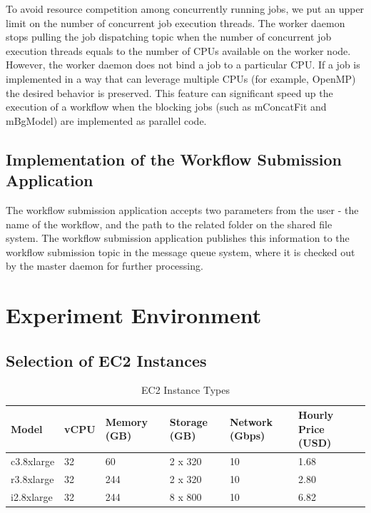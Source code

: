 To avoid resource competition among concurrently running jobs, we put an upper limit on the number of concurrent job execution threads. The worker daemon stops pulling the job dispatching topic when the number of concurrent job execution threads equals to the number of CPUs available on the worker node. However, the worker daemon does not bind a job to a particular CPU. If a job is implemented in a way that can leverage multiple CPUs (for example,  OpenMP) the desired behavior is preserved. This feature can significant speed up the execution of a workflow when the blocking jobs (such as mConcatFit and mBgModel) are implemented as parallel code. 

\subsection{Implementation of the Workflow Submission Application}
\label{sec:subsec:submission_application}

The workflow submission application accepts two parameters from the user - the name of the workflow, and the path to the related folder on the shared file system. The workflow submission application publishes this information to the workflow submission topic in the message queue system, where it is checked out by the master daemon for further processing. 




\section{Experiment Environment}
\label{v2_sec:setup}

\subsection{Selection of EC2 Instances}
\label{sec:subsec:ec2_selection}


\begin{table}[t!]
\caption{EC2 Instance Types}
\label{tbl:instance_type}
\centering
\begin{tabular}{|p{2.5cm}|p{1.5cm}|p{1.5cm}|p{1.5cm}|p{1.5cm}|p{2.5cm}|}
\hline
Model & vCPU & Memory (GB) & Storage (GB) & Network (Gbps) & Hourly Price  (USD)\\ \hline
c3.8xlarge & 32 & 60  & 2 x 320 & 10 & 1.68\\ \hline
r3.8xlarge & 32 & 244 & 2 x 320 & 10 & 2.80\\ \hline
i2.8xlarge & 32 & 244 & 8 x 800 & 10 & 6.82\\ \hline
\end{tabular}
\end{table}



